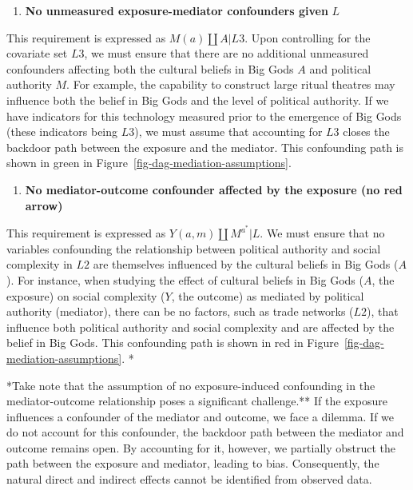 \documentclass[
  singlecolumn]{report}
\providecommand{\tightlist}{%
  \setlength{\itemsep}{0pt}\setlength{\parskip}{0pt}}\usepackage{longtable,booktabs,array}
\begin{document}
\begin{enumerate}
\def\labelenumi{\arabic{enumi}.}
\setcounter{enumi}{2}
\tightlist
\item
  \textbf{No unmeasured exposure-mediator confounders given} \(L\)
\end{enumerate}

This requirement is expressed as \(M(a) \coprod A | L3\). Upon
controlling for the covariate set \(L3\), we must ensure that there are
no additional unmeasured confounders affecting both the cultural beliefs
in Big Gods \(A\) and political authority \(M\). For example, the
capability to construct large ritual theatres may influence both the
belief in Big Gods and the level of political authority. If we have
indicators for this technology measured prior to the emergence of Big
Gods (these indicators being \(L3\)), we must assume that accounting for
\(L3\) closes the backdoor path between the exposure and the mediator.
This confounding path is shown in green in
Figure~\ref{fig-dag-mediation-assumptions}.

\begin{enumerate}
\def\labelenumi{\arabic{enumi}.}
\setcounter{enumi}{3}
\tightlist
\item
  \textbf{No mediator-outcome confounder affected by the exposure (no
  red arrow)}
\end{enumerate}

This requirement is expressed as \(Y(a,m) \coprod M^{a^*} | L\). We must
ensure that no variables confounding the relationship between political
authority and social complexity in \(L2\) are themselves influenced by
the cultural beliefs in Big Gods (\(A\)). For instance, when studying
the effect of cultural beliefs in Big Gods (\(A\), the exposure) on
social complexity (\(Y\), the outcome) as mediated by political
authority (mediator), there can be no factors, such as trade networks
(\(L2\)), that influence both political authority and social complexity
and are affected by the belief in Big Gods. This confounding path is
shown in red in Figure~\ref{fig-dag-mediation-assumptions}. *

*Take note that the assumption of no exposure-induced confounding in the
mediator-outcome relationship poses a significant challenge.** If the
exposure influences a confounder of the mediator and outcome, we face a
dilemma. If we do not account for this confounder, the backdoor path
between the mediator and outcome remains open. By accounting for it,
however, we partially obstruct the path between the exposure and
mediator, leading to bias. Consequently, the natural direct and indirect
effects cannot be identified from observed data.
\end{document}
